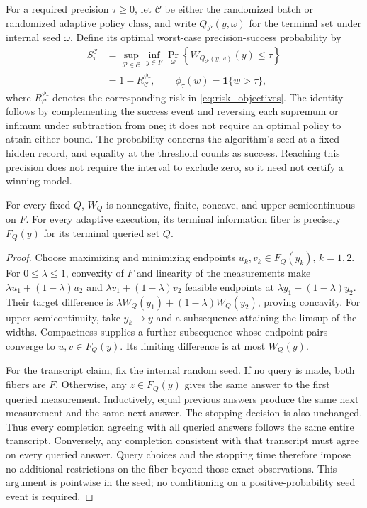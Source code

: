 For a required precision $\tau\geq0$, let $\mathcal C$ be either the
randomized batch or randomized adaptive policy class, and write
$Q_{\mathcal P}(y,\omega)$ for the terminal set under internal seed
$\omega$. Define its optimal worst-case precision-success probability by
\begin{equation}
\begin{aligned}
 S_\tau^{\mathcal C}
 &=\sup_{\mathcal P\in\mathcal C}\inf_{y\in F}
   \Pr_\omega\!\left\{W_{Q_{\mathcal P}(y,\omega)}(y)\leq\tau\right\}\\
 &=1-R_{\mathcal C}^{\phi_\tau},\qquad
   \phi_\tau(w)=\boldsymbol{1}\{w>\tau\},
\end{aligned}
\label{eq:risk_precision_success}
\end{equation}
where $R_{\mathcal C}^{\phi_\tau}$ denotes the corresponding risk in
\eqref{eq:risk_objectives}. The identity follows by complementing the
success event and reversing each supremum or infimum under subtraction
from one; it does not require an optimal policy to attain either bound.
The probability concerns the algorithm's seed at a fixed hidden record,
and equality at the threshold counts as success. Reaching this precision
does not require the interval to exclude zero, so it need not certify a
winning model.

\begin{proposition}
\label{prop:risk_concavity_transcript}
For every fixed $Q$, $W_Q$ is nonnegative, finite, concave, and upper
semicontinuous on $F$. For every adaptive execution, its terminal
information fiber is precisely $F_Q(y)$ for its terminal queried set $Q$.
\end{proposition}
\begin{proof}
Choose maximizing and minimizing endpoints $u_k,v_k\in F_Q(y_k)$,
$k=1,2$. For $0\le\lambda\le1$, convexity of $F$ and linearity of the
measurements make $\lambda u_1+(1-\lambda)u_2$ and
$\lambda v_1+(1-\lambda)v_2$ feasible endpoints at
$\lambda y_1+(1-\lambda)y_2$. Their target difference is
$\lambda W_Q(y_1)+(1-\lambda)W_Q(y_2)$, proving concavity.
For upper semicontinuity, take $y_k\to y$ and a subsequence attaining
the limsup of the widths. Compactness supplies a further subsequence
whose endpoint pairs converge to $u,v\in F_Q(y)$. Its limiting
difference is at most $W_Q(y)$.

For the transcript claim, fix the internal random seed. If no query is
made, both fibers are $F$. Otherwise, any
$z\in F_Q(y)$ gives the same answer to the first queried measurement.
Inductively, equal previous answers produce the same next measurement
and the same next answer. The stopping decision is also unchanged.
Thus every completion agreeing with all queried answers follows the
same entire transcript. Conversely, any completion consistent with
that transcript must agree on every queried answer. Query choices and
the stopping time therefore impose no additional restrictions on the
fiber beyond those exact observations. This argument is pointwise in the
seed; no conditioning on a positive-probability seed event is required.
\end{proof}


